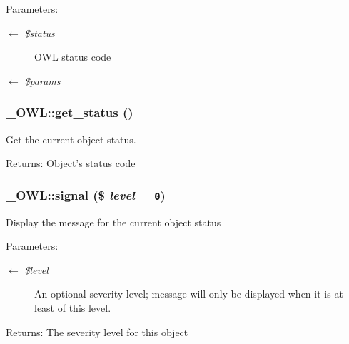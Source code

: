 \begin{Desc}
\item[Parameters:]
\begin{description}
\item[\mbox{$\leftarrow$} {\em \$status}]OWL status code \item[\mbox{$\leftarrow$} {\em \$params}]\end{description}
\end{Desc}
\hypertarget{class__OWL_99ec771fa2c5c279f80152cc09e489a8}{
\subsubsection{\setlength{\rightskip}{0pt plus 5cm}\_\-OWL::get\_\-status ()}}
\label{class__OWL_99ec771fa2c5c279f80152cc09e489a8}


Get the current object status.

\begin{Desc}
\item[Returns:]Object's status code \end{Desc}
\hypertarget{class__OWL_61c04b80fe17e2f1e339a6d6a89e45f3}{
\subsubsection{\setlength{\rightskip}{0pt plus 5cm}\_\-OWL::signal (\$ {\em level} = {\tt 0})}}
\label{class__OWL_61c04b80fe17e2f1e339a6d6a89e45f3}


Display the message for the current object status

\begin{Desc}
\item[Parameters:]
\begin{description}
\item[\mbox{$\leftarrow$} {\em \$level}]An optional severity level; message will only be displayed when it is at least of this level. \end{description}
\end{Desc}
\begin{Desc}
\item[Returns:]The severity level for this object \end{Desc}


